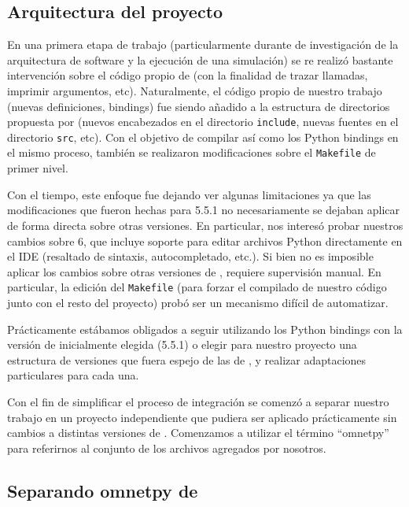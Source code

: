 \documentclass[]{article}
\begin{document}
\subsection{Arquitectura del proyecto}

En una primera etapa de trabajo (particularmente durante de investigación de la
arquitectura de software y la ejecución de una simulación) se re realizó
bastante intervención sobre el código propio de \omnetpp{} (con la finalidad de
trazar llamadas, imprimir argumentos, etc). Naturalmente, el código propio de
nuestro trabajo (nuevas definiciones, bindings) fue siendo añadido a la
estructura de directorios propuesta por \omnetpp{} (nuevos encabezados en el
directorio \verb!include!, nuevas fuentes en el directorio \verb!src!, etc).
Con el objetivo de compilar \omnetpp{} así como los Python bindings en el mismo
proceso, también se realizaron modificaciones sobre el \verb!Makefile! de
primer nivel.

Con el tiempo, este enfoque fue dejando ver algunas limitaciones ya que las
modificaciones que fueron hechas para \omnetpp{} 5.5.1 no necesariamente se
dejaban aplicar de forma directa sobre otras versiones. En particular, nos
interesó probar nuestros cambios sobre \omnetpp{} 6, que incluye soporte para
editar archivos Python directamente en el IDE (resaltado de sintaxis,
autocompletado, etc.). Si bien no es imposible aplicar los cambios sobre otras
versiones de \omnetpp{}, requiere supervisión manual. En particular, la edición
del \verb!Makefile! (para forzar el compilado de nuestro código junto con el
resto del proyecto) probó ser un mecanismo difícil de automatizar.

Prácticamente estábamos obligados a seguir utilizando los Python bindings con
la versión de \omnetpp{} inicialmente elegida (5.5.1) o elegir para nuestro
proyecto una estructura de versiones que fuera espejo de las de \omnetpp{}, y
realizar adaptaciones particulares para cada una.

Con el fin de simplificar el proceso de integración se comenzó a separar
nuestro trabajo en un proyecto independiente que pudiera ser aplicado
prácticamente sin cambios a distintas versiones de \omnetpp{}. Comenzamos a
utilizar el término ``omnetpy'' para referirnos al conjunto de los archivos
agregados por nosotros.

\subsection{Separando omnetpy de \omnetpp{}}
\end{document}
